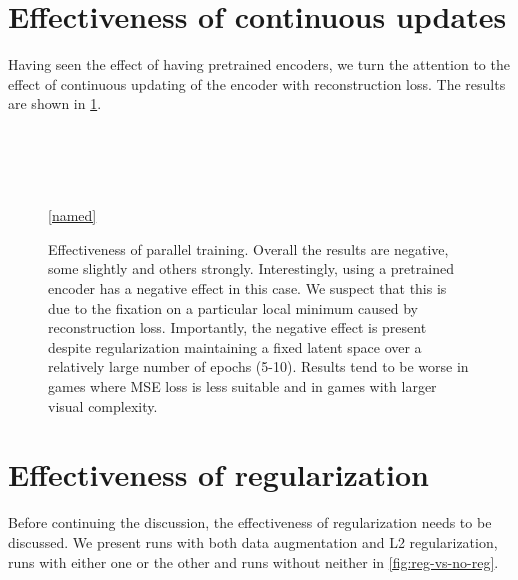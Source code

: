\section{Effectiveness of continuous updates}
\label{sec-effectiveness-of-parallel}
Having seen the effect of having pretrained encoders, we turn the attention
to the effect of continuous updating of the encoder with reconstruction loss.
The results are shown in \ref{fig-parallel}.

\begin{figure}[!t]
  \captionsetup[subfloat]{position=top,labelformat=empty}
  \centering

    \subfloat[]{  \resizebox{0.4\textwidth}{!}{}}
    \subfloat[]{  \resizebox{0.4\textwidth}{!}{}}\\
  \vspace{-1cm}
    \subfloat[]{  \resizebox{0.4\textwidth}{!}{}}
    \subfloat[]{  \resizebox{0.4\textwidth}{!}{}}\\
  \vspace{-1cm}
    \subfloat[]{  \resizebox{0.4\textwidth}{!}{}}
    \subfloat[]{  \resizebox{0.4\textwidth}{!}{}}\\
  \vspace{-1cm}
    \subfloat[]{  \resizebox{0.4\textwidth}{!}{}}
  \\

  \ref{named}
  \caption{Effectiveness of parallel training. Overall the results are negative, some slightly
  and others strongly. Interestingly, using a pretrained encoder has a negative effect
in this case. We suspect that this is due to the fixation on a particular local minimum caused
by reconstruction loss. Importantly, the negative effect is present despite
regularization maintaining a fixed latent space over a relatively large number of epochs (5-10).
Results tend to be worse in games where MSE loss is less suitable and in games
with larger visual complexity.}
  \label{fig-parallel}
\end{figure}

\section{Effectiveness of regularization}
\label{sec-effectiveness-of-reg}
Before continuing the discussion, the effectiveness of regularization needs to be discussed.
We present runs with both data augmentation and L2 regularization, runs with either one or the other and
runs without neither in \ref{fig:reg-vs-no-reg}.

